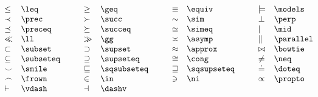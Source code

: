 \begin{table}
$$
\hspace{-.5cm}
\begin{array}{ll@{\hspace{1cm}}ll@{\hspace{1cm}}ll@{\hspace{1cm}}ll}
 \leq & \verb+\leq+ & \geq & \verb+\geq+ & \equiv & \verb+\equiv+ &
\models & \verb+\models+ \\
 \prec & \verb+\prec+ & \succ & \verb+\succ+ & \sim & \verb+\sim+ &
\perp & \verb+\perp+ \\
 \preceq & \verb+\preceq+ & \succeq & \verb+\succeq+ & \simeq &
\verb+\simeq+ & \mid & \verb+\mid+ \\
 \ll & \verb+\ll+ & \gg & \verb+\gg+ & \asymp & \verb+\asymp+ &
\parallel & \verb+\parallel+ \\
 \subset & \verb+\subset+ & \supset & \verb+\supset+ & \approx &
\verb+\approx+ & \bowtie &\verb+\bowtie+ \\
\subseteq & \verb+\subseteq+ & \supseteq & \verb+\supseteq+ & \cong &
\verb+\cong+ & \neq & \verb+\neq+ \\
\smile & \verb+\smile+  & \sqsubseteq & \verb+\sqsubseteq+ &
\sqsupseteq & \verb+\sqsupseteq+ 
& \doteq & \verb+\doteq+ \\
\frown & \verb+\frown+ &
 \in & \verb+\in+ & \ni & \verb+\ni+ & \propto & \verb+\propto+  \\
 \vdash & \verb+\vdash+ & \dashv & \verb+\dashv+ &&\\
\end{array}
$$
\caption{S{\'\i}mbolos relacionales.}
\label{relacionales}
\end{table}

